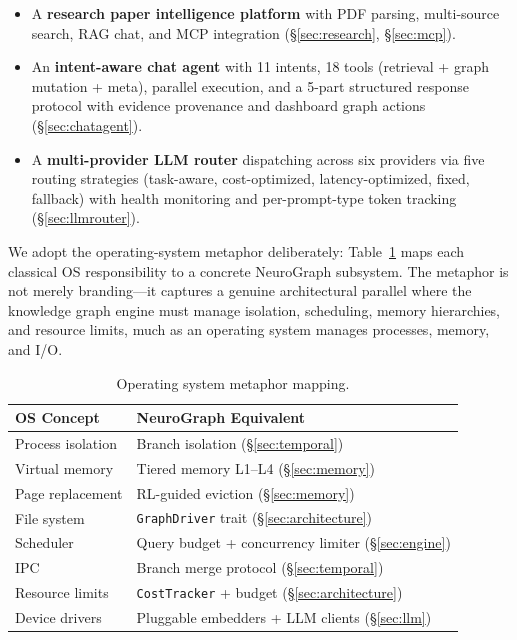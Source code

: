 \documentclass[11pt,a4paper,twocolumn]{article}
\begin{document}
\begin{itemize}[leftmargin=*]
    point-in-time snapshots, Git-like branching, hybrid logical clock,
    fact version chains, and graph-level forgetting
    (\S\ref{sec:temporal}).
  \item A \textbf{research paper intelligence platform} with PDF
    parsing, multi-source search, RAG chat, and MCP integration
    (\S\ref{sec:research}, \S\ref{sec:mcp}).
  \item An \textbf{intent-aware chat agent} with 11 intents,
    18 tools (retrieval + graph mutation + meta), parallel execution,
    and a 5-part structured response protocol with evidence provenance
    and dashboard graph actions (\S\ref{sec:chatagent}).
  \item A \textbf{multi-provider LLM router} dispatching across six
    providers via five routing strategies (task-aware, cost-optimized,
    latency-optimized, fixed, fallback) with health monitoring and
    per-prompt-type token tracking (\S\ref{sec:llmrouter}).
\end{itemize}

We adopt the operating-system metaphor deliberately:
Table~\ref{tab:os-mapping} maps each classical OS responsibility
to a concrete NeuroGraph subsystem. The metaphor is not merely
branding---it captures a genuine architectural parallel where the
knowledge graph engine must manage isolation, scheduling, memory
hierarchies, and resource limits, much as an operating system
manages processes, memory, and I/O.

\begin{table}[H]
\centering
\footnotesize
\caption{Operating system metaphor mapping.}
\label{tab:os-mapping}
\begin{tabular}{@{}ll@{}}
\toprule
\textbf{OS Concept} & \textbf{NeuroGraph Equivalent} \\
\midrule
Process isolation & Branch isolation (\S\ref{sec:temporal}) \\
Virtual memory & Tiered memory L1--L4 (\S\ref{sec:memory}) \\
Page replacement & RL-guided eviction (\S\ref{sec:memory}) \\
File system & \texttt{GraphDriver} trait (\S\ref{sec:architecture}) \\
Scheduler & Query budget + concurrency limiter (\S\ref{sec:engine}) \\
IPC & Branch merge protocol (\S\ref{sec:temporal}) \\
Resource limits & \texttt{CostTracker} + budget (\S\ref{sec:architecture}) \\
Device drivers & Pluggable embedders + LLM clients (\S\ref{sec:llm}) \\
\bottomrule
\end{tabular}
\end{table}
\end{document}
